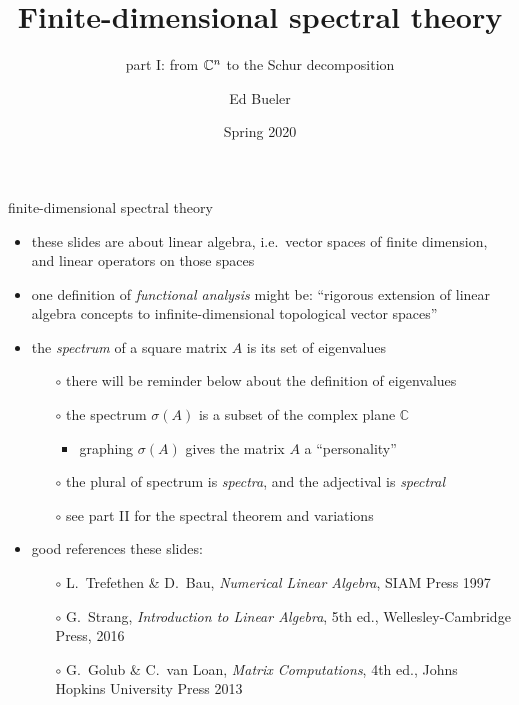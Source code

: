 \documentclass[10pt,hyperref]{beamer}
\title{Finite-dimensional spectral theory}
\subtitle{part I: from $\CC^n$ to the Schur decomposition}
\author{Ed Bueler}
\institute[MATH 617]{MATH 617 Functional Analysis}
\date{Spring 2020}
\newcommand{\CC}{\mathbb{C}}
\begin{document}
\beamertemplatenavigationsymbolsempty

\begin{frame}
  \maketitle
\end{frame}


\begin{frame}{finite-dimensional spectral theory}

\begin{itemize}
\item these slides are about linear algebra, i.e.~vector spaces of finite dimension, and linear operators on those spaces
\item one definition of \emph{functional analysis} might be: ``rigorous extension of linear algebra concepts to infinite-dimensional topological vector spaces''
\item the \emph{spectrum} of a square matrix $A$ is its set of eigenvalues
    \begin{itemize}
    \item[$\circ$] there will be reminder below about the definition of eigenvalues
    \item[$\circ$] the spectrum $\sigma(A)$ is a subset of the complex plane $\CC$
        \begin{itemize}
        \item graphing $\sigma(A)$ gives the matrix $A$ a ``personality''
        \end{itemize}
    \item[$\circ$] the plural of spectrum is \emph{spectra}, and the adjectival is \emph{spectral}
    \item[$\circ$] see part II for the spectral theorem and variations
    \end{itemize}
\item good references these slides:
    \begin{itemize}
    \item[$\circ$] L.~Trefethen \& D.~Bau, \emph{Numerical Linear Algebra}, SIAM Press 1997
    \item[$\circ$] G.~Strang, \emph{Introduction to Linear Algebra}, 5th ed., Wellesley-Cambridge Press, 2016
    \item[$\circ$] G.~Golub \& C.~van Loan, \emph{Matrix Computations}, 4th ed., Johns Hopkins University Press 2013
    \end{itemize}

\end{itemize}
\end{frame}
\end{document}
